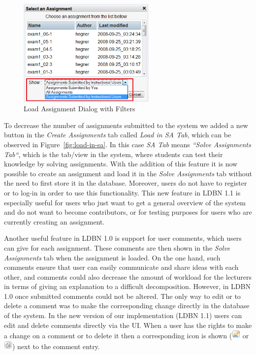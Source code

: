 \begin{figure}[h]
	\begin{center}
		\includegraphics[width=0.6\textwidth]{./img/load-assg.png}
		\caption{Load Assignment Dialog with Filters}
		\label{fig:load-assg}
	\end{center}
\end{figure}

To decrease the number of assignments submitted to the system we added a new button
in the \emph{Create Assignments} tab called \emph{Load in SA Tab}, 
which can be observed in Figure~\ref{fig:load-in-sa}. 
In this case \emph{SA Tab} means \emph{``Solve Assignments Tab``},
which is the tab/view in the system, where students can test their knowledge by solving assignments. 
With the addition of this feature it is now possible to create an assignment and load it 
in the \emph{Solve Assignments} tab without
the need to first store it in the database. Moreover, users do not have to register or 
to log-in in order to use this
functionality. This new feature in LDBN 1.1 is especially useful for users who 
just want to get a general overview of the system and
do not want to become contributors, 
or for testing purposes for users who are currently creating an assignment. 

Another useful feature in LDBN 1.0 is support for user comments, 
which users can give for each assignment. These comments
are then shown in the \emph{Solve Assignments} tab when the assignment is loaded. On the one
hand, such comments ensure that user can easily communicate and share ideas with each
other, and comments could also decrease the amount of workload
for the lecturers in terms of giving an explanation to a difficult decomposition. However, in LDBN 1.0  
once submitted comments could not be altered. The only way to edit or to delete a
comment was to make the corresponding change directly in the database of the system. 
In the new version of our implementation (LDBN 1.1) 
users can edit and delete comments directly via the UI. When a user has
the rights to make a change on a comment or to delete it then a corresponding icon is shown 
(\includegraphics[scale=0.7]{./img/edit.png} or \includegraphics[scale=0.7]{./img/del.png})
next to the comment entry.

